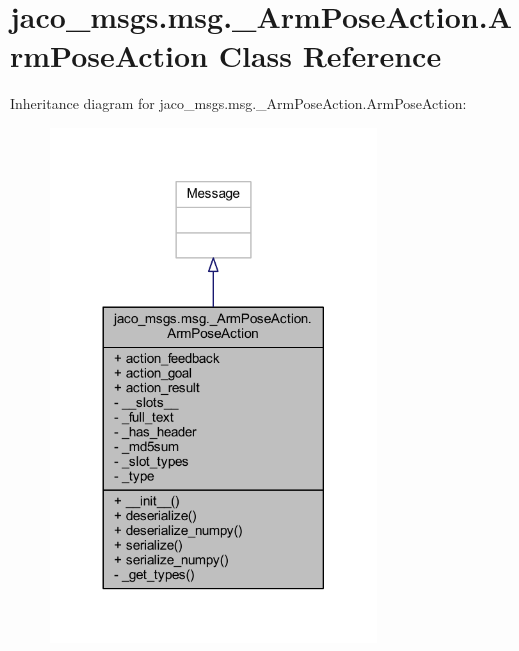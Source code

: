 \hypertarget{classjaco__msgs_1_1msg_1_1__ArmPoseAction_1_1ArmPoseAction}{}\section{jaco\+\_\+msgs.\+msg.\+\_\+\+Arm\+Pose\+Action.\+Arm\+Pose\+Action Class Reference}
\label{classjaco__msgs_1_1msg_1_1__ArmPoseAction_1_1ArmPoseAction}


Inheritance diagram for jaco\+\_\+msgs.\+msg.\+\_\+\+Arm\+Pose\+Action.\+Arm\+Pose\+Action\+:
\nopagebreak
\begin{figure}[H]
\begin{center}
\leavevmode
\includegraphics[width=245pt]{d4/d0a/classjaco__msgs_1_1msg_1_1__ArmPoseAction_1_1ArmPoseAction__inherit__graph}
\end{center}
\end{figure}


